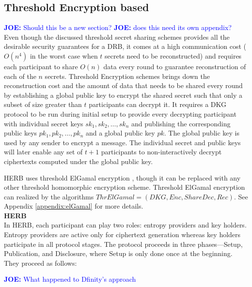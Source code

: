 \documentclass[letterpaper,twocolumn,10pt]{article}
\theoremstyle{definition}
\theoremstyle{remark}
\newcommand{\joenote}[1]{\textcolor{blue}{\textbf{JOE:} #1}}
\begin{document}
\subsection{Threshold Encryption based}
\joenote{Should this be a new section?}
\joenote{does this need its own appendix?}
 Even though the discussed threshold secret sharing schemes provides all the desirable security guarantees for a DRB, it comes at a high communication cost ($O(n^4)$ in the worst case when $t$ secrets need to be reconstructed) and requires each participant to share $O(n)$ data every round to guarantee reconstruction of each of the $n$ secrets. Threshold Encryption schemes brings down the reconstruction cost and the amount of data that needs to be shared every round by establishing a global public key to encrypt the shared secret such that only a subset of size greater than $t$ participants can decrypt it. It requires a DKG protocol to be run during initial setup to provide every decrypting participant with individual secret keys $sk_1, sk_2, \ldots, sk_n$ and publishing the corresponding public keys $pk_1, pk_2, \ldots, pk_n$ and a global public key $pk$. The global public key is used by any sender to encrypt a message. The individual secret and public keys will later enable any set of $t + 1$ participants to non-interactively decrypt ciphertexts computed under the global public key.
 
 HERB \cite{cherniaeva2019homomorphic} uses threshold ElGamal encryption \cite{desmedt1990Threshold}, though it can be replaced with any other threshold homomorphic encryption scheme. Threshold ElGamal encryption can realized by the algorithms $ThrElGamal = (DKG, Enc, ShareDec, Rec)$. See Appendix \ref{appendix:elGamal} for more details. \\
 
\textbf{HERB}\\

In HERB, each participant can play two roles: entropy providers and key holders. Entropy providers are active only for ciphertext generation whereas key holders participate in all protocol stages. The protocol proceeds in three phases---Setup, Publication, and Disclosure, where Setup is only done once at the beginning. They proceed as follows:

\joenote{What happened to Dfinity's approach}
\end{document}
